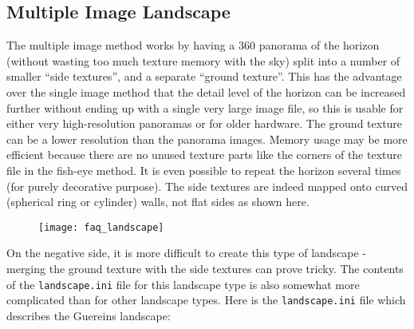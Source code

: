 \subsection{Multiple Image Landscape}\label{multiple-image-method}

The multiple image method works by having a 360 panorama of the horizon
(without wasting too much texture memory with the sky) split into a
number of smaller ``side textures'', and a separate ``ground texture''.
This has the advantage over the single image method that the detail
level of the horizon can be increased further without ending up with a
single very large image file, so this is usable for either very
high-resolution panoramas or for older hardware. The ground texture can
be a lower resolution than the panorama images. Memory usage may be more
efficient because there are no unused texture parts like the corners of
the texture file in the fish-eye method. It is even possible to repeat
the horizon several times (for purely decorative purpose). The side
textures are indeed mapped onto curved (spherical ring or cylinder)
walls, not flat sides as shown here.

\begin{figure}[h]
\centering\texttt{[image: faq\_landscape]}
\end{figure}

On the negative side, it is more difficult to create this type of
landscape - merging the ground texture with the side textures can prove
tricky. The contents of the \texttt{landscape.ini} file for this
landscape type is also somewhat more complicated than for other
landscape types. Here is the \texttt{landscape.ini} file which describes
the Guereins landscape:

